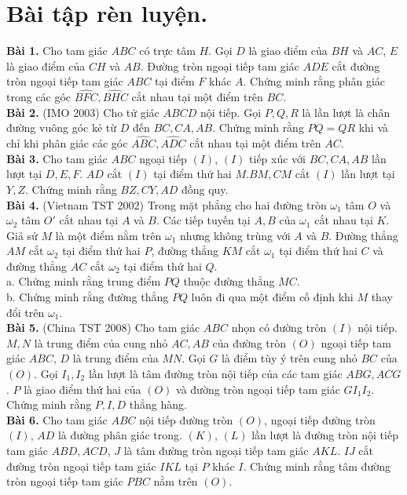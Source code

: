 \documentclass[12pt,a4paper]{article}
\begin{document}
\section{Bài tập rèn luyện.}
\textbf{Bài 1.} Cho tam giác \(ABC\) có trực tâm \(H\). Gọi \(D\) là giao điểm của \(BH\) và \(AC\), \(E\) là giao điểm của \(CH\) và \(AB\). Đường tròn ngoại tiếp tam giác \(ADE\) cắt đường tròn ngoại tiếp tam giác \(ABC\) tại điểm \(F\) khác \(A\). Chứng minh rằng phân giác trong các góc \(\widehat {BFC},\widehat {BHC}\) cắt nhau tại một điểm trên \(BC\).\\
\textbf{Bài 2.} (IMO 2003) Cho tứ giác \(ABCD\) nội tiếp. Gọi \(P, Q, R\) là lần lượt là chân đường vuông góc kẻ từ \(D\) đến \(BC, CA, AB\). Chứng minh rằng \(PQ = QR\) khi và chỉ khi phân giác các góc \(\widehat {ABC},\widehat {ADC}\) cắt nhau tại một điểm trên \(AC\).\\
\textbf{Bài 3.} Cho tam giác \(ABC\) ngoại tiếp \(\left( I \right)\), \(\left( I \right)\) tiếp xúc với \(BC, CA, AB\) lần lượt tại \(D, E, F\). \(AD\) cắt \(\left( I \right)\) tại điểm thứ hai \(M\).\(BM, CM\) cắt \(\left( I \right)\) lần lượt tại \(Y, Z\). Chứng minh rằng \(BZ, CY, AD\) đồng quy. \\
\textbf{Bài 4.} (Vietnam TST 2002) Trong mặt phẳng cho hai đường tròn \({\omega _1}\) tâm \(O\) và \({\omega _2}\) tâm \(O'\) cắt nhau tại \(A\) và \(B\). Các tiếp tuyến tại \(A, B\) của \({\omega _1}\) cắt nhau tại \(K\). Giả sử \(M\) là một điểm nằm trên \({\omega _1}\) nhưng không trùng với \(A\) và \(B\). Đường thẳng \(AM\) cắt \({\omega _2}\) tại điểm thứ hai \(P\), đường thẳng \(KM\) cắt \({\omega _1}\) tại điểm thứ hai \(C\) và đường thẳng \(AC\) cắt \({\omega _2}\) tại điểm thứ hai \(Q\).\\
a. Chứng minh rằng trung điểm \(PQ\) thuộc đường thẳng \(MC\).\\
b. Chứng minh rằng đường thẳng \(PQ\) luôn đi qua một điểm cố định khi \(M\) thay đổi trên \({\omega _1}\).\\
\textbf{Bài 5.} (China TST 2008) Cho tam giác \(ABC\) nhọn có đường tròn \(\left( I \right)\) nội tiếp. \(M, N\) là trung điểm của cung nhỏ \(AC, AB\) của đường tròn \(\left( O \right)\) ngoại tiếp tam giác \(ABC\), \(D\) là trung điểm của \(MN\). Gọi \(G\) là điểm tùy ý trên cung nhỏ \(BC\) của \(\left( O \right)\). Gọi \({I_1}, {I_2}\) lần lượt là tâm đường tròn nội tiếp của các tam giác \(ABG, ACG\). \(P\) là giao điểm thứ hai của \(\left( O \right)\) và đường tròn ngoại tiếp tam giác \(G{I_1}{I_2}\). Chứng minh rằng \(P, I, D\) thẳng hàng.\\
\textbf{Bài 6.} Cho tam giác \(ABC\) nội tiếp đường tròn \(\left( O \right)\), ngoại tiếp đường tròn \(\left( I \right)\), \(AD\) là đường phân giác trong. \(\left( K \right)\), \(\left( L \right)\) lần lượt là đường tròn nội tiếp tam giác \(ABD, ACD\), \(J\) là tâm đường tròn ngoại tiếp tam giác \(AKL\). \(IJ\) cắt đường tròn ngoại tiếp tam giác \(IKL\) tại \(P\) khác \(I\). Chứng minh rằng tâm đường tròn ngoại tiếp tam giác \(PBC\) nằm trên  \(\left( O \right)\).
\newpage
\end{document}

